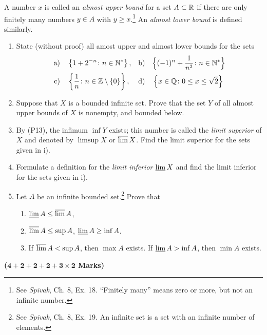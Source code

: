 \documentclass[a4paper]{article}
\begin{document}
\begin{Exercise}
\label{limsupsets.ex}
A number $x$ is called an \emph{almost upper bound}
 for a set $A\subset\mathbb{R}$ if there are only 
finitely many numbers $y\in A$ with $y\ge x$.\footnote{See \emph{Spivak}, Ch. 8, Ex. 18. ``Finitely many'' means zero or more, but not an infinite number.} An \emph{almost lower bound} is defined similarly. 
\begin{enumerate}
\item 	State (without proof) all amost upper and almost lower bounds for the sets
			\begin{align*}
			\text{a)}\quad& \left\{ 1+2^{-n}\colon n\in \mathbb{N}^*\right\}, &
			\text{b)}\quad& \Bigl\{ (-1)^n+\frac{1}{n^2}\colon n\in \mathbb{N}^*\Bigr\} \\ 
			\text{c)}\quad& \left\{\frac{1}{n}\colon n\in \mathbb{Z}\setminus\{0\}\right\}, &
			\text{d)}\quad& \left\{x\in\mathbb{Q}\colon 0\le x\le \sqrt{2}\right\}
			\end{align*}
\item 	Suppose that $X$ is a bounded infinite set. Prove that the set $Y$ of all almost upper 
		bounds of $X$ is nonempty, and bounded below.
\item 	By (P13), the infimum $\inf Y$ exists; this number is called the \emph{limit superior} of 
		$X$ and denoted by $\limsup X$ or $\varlimsup X$. Find the limit superior for 
		the sets given in i). 
\item 	Formulate a definition for the \emph{limit inferior} 
		$\varliminf X$ and find the limit inferior for 
		the sets given in i).
\item 	Let $A$ be an infinite bounded set.\footnote{See \emph{Spivak}, Ch. 8, Ex. 19. An infinite set is a set with an infinite number of elements.} Prove that
		\begin{enumerate}
			\item $\varliminf A\le \varlimsup A$,
			\item $\varlimsup A\le \sup A$, $\varliminf A\ge \inf A$.
			\item If $\varlimsup A<\sup A$, then $\max A$ exists. If $\varliminf A>\inf A$, then $\min A$ exists.
		\end{enumerate}
\end{enumerate}
\textbf{($\boldsymbol{4+2+2+2+3\times 2}$ Marks)}
\end{Exercise}
\end{document}

